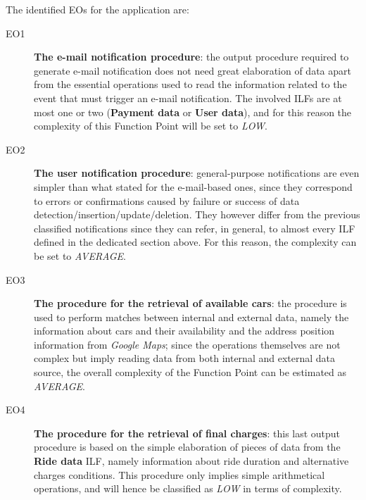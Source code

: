 The identified EOs for the application are:
\begin{description}
\item[EO1] \textbf{The e-mail notification procedure}: the output procedure required to generate e-mail notification does not need great elaboration of data apart from the essential operations used to read the information related to the event that must trigger an e-mail notification. The involved ILFs are at most one or two (\textbf{Payment data} or \textbf{User data}), and for this reason the complexity of this Function Point will be set to \textit{LOW}.
\item[EO2] \textbf{The user notification procedure}: general-purpose notifications are even simpler than what stated for the e-mail-based ones, since they correspond to errors or confirmations caused by failure or success of data detection/insertion/update/deletion. They however differ from the previous classified notifications since they can refer, in general, to almost every ILF defined in the dedicated section above. For this reason, the complexity can be set to \textit{AVERAGE}.
\item[EO3] \textbf{The procedure for the retrieval of available cars}: the procedure is used to perform matches between internal and external data, namely the information about cars and their availability and the address position information from \textit{Google Maps}; since the operations themselves are not complex but imply reading data from both internal and external data source, the overall complexity of the Function Point can be estimated as \textit{AVERAGE}.
\item[EO4] \textbf{The procedure for the retrieval of final charges}: this last output procedure is based on the simple elaboration of pieces of data from the \textbf{Ride data} ILF, namely information about ride duration and alternative charges conditions. This procedure only implies simple arithmetical operations, and will hence be classified as \textit{LOW} in terms of complexity.
\end{description}

